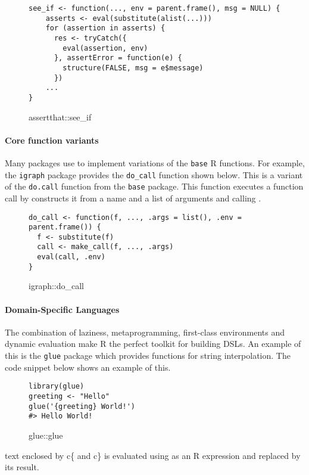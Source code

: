 \documentclass[screen,acmsmall]{acmart}%
\newcommand{\code}[1]{\lstinline |#1|\xspace}
\begin{document}
\begin{figure}[h]
\begin{lstlisting}
see_if <- function(..., env = parent.frame(), msg = NULL) {
    asserts <- eval(substitute(alist(...)))
    for (assertion in asserts) {
      res <- tryCatch({
        eval(assertion, env)
      }, assertError = function(e) {
        structure(FALSE, msg = e$message)
      })
    ...
}
\end{lstlisting}
  \caption{assertthat::see\_if}
\end{figure}

\paragraph{Core function variants} Many packages use \eval to implement variations of the
\code{base} R functions. For example, the \code{igraph} package provides the
\code{do_call} function shown below. This is a variant of the \code{do.call}
function from the \code{base} package. This function executes a function call by
constructs it from a name and a list of arguments and calling \eval.

\begin{figure}[h]
\begin{lstlisting}
do_call <- function(f, ..., .args = list(), .env = parent.frame()) {
  f <- substitute(f)
  call <- make_call(f, ..., .args)
  eval(call, .env)
}
\end{lstlisting}
\caption{igraph::do\_call}
\end{figure}

\paragraph{Domain-Specific Languages} The combination of laziness, metaprogramming,
first-class environments and dynamic evaluation make R the perfect toolkit for
building DSLs. An example of this is the \code{glue} package which provides
functions for string interpolation. The code snippet below shows an example of
this.

\begin{figure}[h]
\begin{lstlisting}
library(glue)
greeting <- "Hello"
glue('{greeting} World!')
#> Hello World!
\end{lstlisting}
  \caption{glue::glue}
\end{figure}

text enclosed by c{\{} and c{\}} is
evaluated using \eval as an R expression and replaced by its result.
\end{document}
